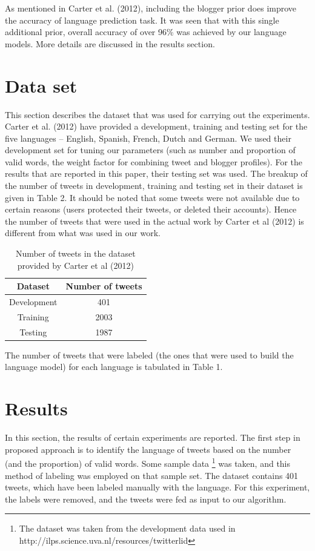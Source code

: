 \documentclass[11pt]{article}
\begin{document}
As mentioned in Carter et al. (2012), including the blogger prior does improve the accuracy of language prediction task. It was seen that with this single additional prior, overall accuracy of over 96\% was achieved by our language models. More details are discussed in the results section.

\section{Data set}
This section describes the dataset that was used for carrying out the experiments. Carter et al. (2012) have provided a development, training and testing set for the five languages -- English, Spanish, French, Dutch and German. We used their development set for tuning our parameters (such as number and proportion of valid words, the weight factor for combining tweet and blogger profiles). For the results that are reported in this paper, their testing set was used. The breakup of the number of tweets in development, training and testing set in their dataset is given in Table 2. It should be noted that some tweets were not available due to certain reasons (users protected their tweets, or deleted their accounts). Hence the number of tweets that were used in the actual work by Carter et al (2012) is different from what was used in our work.

\begin{table}
\begin{center}
\small
\begin{tabular}{|c|c|}
\hline
\textbf{Dataset} & \textbf{Number of tweets} \\
\hline
Development & 401 \\
Training & 2003 \\
Testing & 1987  \\ \hline
\end{tabular}
\caption{\footnotesize Number of tweets in the dataset provided by Carter et al (2012)}
\end{center}
\end{table}

The number of tweets that were labeled (the ones that were used to build the language model) for each language is tabulated in Table 1.


\section{Results}
In this section, the results of certain experiments are reported. The first step in proposed approach is to identify the language of tweets based on the number (and the proportion) of valid words. Some sample data \footnote[3]{The dataset was taken from the development data used in http://ilps.science.uva.nl/resources/twitterlid} was taken, and this method of labeling was employed on that sample set. The dataset contains 401 tweets, which have been labeled manually with the language. For this experiment, the labels were removed, and the tweets were fed as input to our algorithm.
\end{document}
